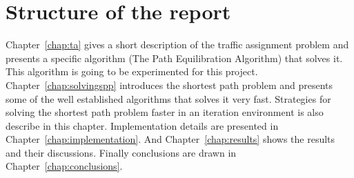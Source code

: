 \begin{comment}
The algorithm that are going to be tested are:
\begin{itemize}
    \item Bellman-Ford Label Correcting Algorithm,
    \item Dijkstra Label Setting Algorithm (using different data structures),
    \item Bidirectional Dijkstra,
    \item A* Search,
    \item Bidirectional A* search.
\end{itemize}

This project also aims to find and discuss techniques that can speed shortest path calculations in an iterative environment:
\begin{itemize}
    \item network preprocessing,
    \item using information from the previous iteration for the current iteration to avoid recalculating shortest paths that are not going to change.
\end{itemize}
\end{comment}

\section{Structure of the report}
Chapter~\ref{chap:ta} gives a short description of the traffic assignment problem
and presents a specific algorithm (The Path Equilibration Algorithm) that solves it.
This algorithm is going to be experimented for this project.
Chapter~\ref{chap:solvingspp} introduces the shortest path problem and presents some of the well established algorithms that solves it very fast.
Strategies for solving the shortest path problem faster in an iteration environment is also describe in this chapter.
Implementation details are presented in Chapter~\ref{chap:implementation}.
And Chapter~\ref{chap:results} shows the results and their discussions.
Finally conclusions are drawn in Chapter~\ref{chap:conclusions}.
